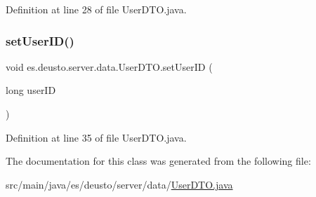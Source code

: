Definition at line 28 of file User\+D\+T\+O.\+java.

\mbox{\label{classes_1_1deusto_1_1server_1_1data_1_1_user_d_t_o_ad96e17b7c2a478f263f7a7b8bf7dde14}} 
\subsubsection{\texorpdfstring{setUserID()}{setUserID()}}
{\footnotesize\ttfamily void es.\+deusto.\+server.\+data.\+User\+D\+T\+O.\+set\+User\+ID (\begin{DoxyParamCaption}\item[{long}]{user\+ID }\end{DoxyParamCaption})}



Definition at line 35 of file User\+D\+T\+O.\+java.



The documentation for this class was generated from the following file\+:\begin{DoxyCompactItemize}
\item 
src/main/java/es/deusto/server/data/\mbox{\hyperlink{_user_d_t_o_8java}{User\+D\+T\+O.\+java}}\end{DoxyCompactItemize}
